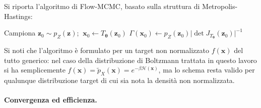 Si riporta l'algoritmo di Flow-MCMC, basato sulla struttura di Metropolis-Hastings:\\
\vspace{3mm}
\begin{algorithm}[H]
\SetAlgoLined
{}
Campiona $\mathbf{z}_0 \sim p_Z(\mathbf{z})$; $\ \mathbf{x}_0 \leftarrow T_{\boldsymbol{\theta}}(\mathbf{z}_0)$\;
    $\Gamma(\mathbf{x}_0) \leftarrow p_Z(\mathbf{z}_0) \big|\det J_{T_{\boldsymbol{\theta}}}(\mathbf{z}_0)\big|^{-1}$\;
\caption{Flow-MCMC}
\label{alg:flow-mcmc}
\end{algorithm} 
\vspace{3mm}
\noindent Si noti che l'algoritmo è formulato per un target non normalizzato $f(\mathbf{x})$ del tutto generico: nel caso della distribuzione di Boltzmann trattata in questo lavoro si ha semplicemente $f(\mathbf{x}) = \tilde{p}_X(\mathbf{x}) = e^{-\beta \mathcal{H}(\mathbf{x})}$, ma lo schema resta valido per qualunque distribuzione target di cui sia nota la densità non normalizzata.

\paragraph*{Convergenza ed efficienza.}

